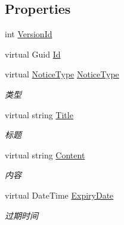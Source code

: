 \subsection*{Properties}
\begin{DoxyCompactItemize}
\item 
int \mbox{\hyperlink{class_t_net_1_1_message_1_1_notice_message_a148940cbeaf7018e0d2ab58460b6a678}{Version\+Id}}
\item 
virtual Guid \mbox{\hyperlink{class_t_net_1_1_message_1_1_notice_message_a2e7154571c50ac740d38ea92cd5b80e8}{Id}}
\item 
virtual \mbox{\hyperlink{namespace_t_net_1_1_model_a84a982245a4f84ccbdcd9cb3763269b6}{Notice\+Type}} \mbox{\hyperlink{class_t_net_1_1_message_1_1_notice_message_a3f597b7dc47fa508f812876b9deeb65d}{Notice\+Type}}
\begin{DoxyCompactList}\small\item\em 类型 \end{DoxyCompactList}\item 
virtual string \mbox{\hyperlink{class_t_net_1_1_message_1_1_notice_message_a83f26d1a0c59ca1c03ba531c0f0f3753}{Title}}
\begin{DoxyCompactList}\small\item\em 标题 \end{DoxyCompactList}\item 
virtual string \mbox{\hyperlink{class_t_net_1_1_message_1_1_notice_message_a1f5f57392cb3f405efd7fd3706bf0c21}{Content}}
\begin{DoxyCompactList}\small\item\em 内容 \end{DoxyCompactList}\item 
virtual Date\+Time \mbox{\hyperlink{class_t_net_1_1_message_1_1_notice_message_aada76a54309bce530af777daf0e91521}{Expiry\+Date}}
\begin{DoxyCompactList}\small\item\em 过期时间 \end{DoxyCompactList}\item 

\end{DoxyCompactItemize}

